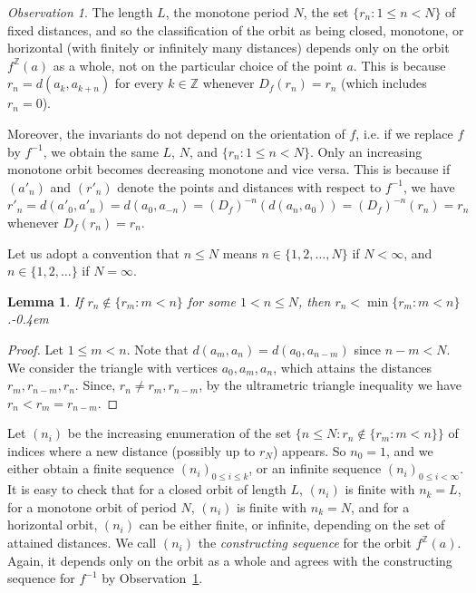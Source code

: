 \documentclass[10pt,a4paper]{article}
\newtheorem{lm}[tw]{Lemma}
\theoremstyle{definition}
\theoremstyle{remark}
\newtheorem{observation}[tw]{Observation}
\newcommand \set [1]{\{#1\}}
\newcommand \Z {\mathbb{Z}}
\begin{document}
\begin{observation} \label{obs:invariant}
    The length $L$, the monotone period $N$, the set $\set{r_n: 1 \leq n < N}$ of fixed distances, and so the classification of the orbit as being closed, monotone, or horizontal (with finitely or infinitely many distances) depends only on the orbit $f^\Z(a)$ as a whole, not on the particular choice of the point $a$.
    This is because $r_n = d(a_k, a_{k + n})$ for every $k \in \Z$ whenever $D_f(r_n) = r_n$ (which includes $r_n = 0$).

    Moreover, the invariants do not depend on the orientation of $f$, i.e. if we replace $f$ by $f^{-1}$, we obtain the same $L$, $N$, and $\set{r_n: 1 \leq n < N}$. Only an increasing monotone orbit becomes decreasing monotone and vice versa.
    This is because if $(a'_n)$ and $(r'_n)$ denote the points and distances with respect to $f^{-1}$, we have $r'_n = d(a'_0, a'_n) = d(a_0, a_{-n}) = (D_f)^{-n}(d(a_n, a_0)) = (D_f)^{-n}(r_n) = r_n$ whenever $D_f(r_n) = r_n$.
\end{observation}

Let us adopt a convention that $n \leq N$ means $n \in \set{1, 2, \ldots, N}$ if $N < \infty$, and $n \in \set{1, 2, \ldots}$ if $N = \infty$.

\begin{lm} \label{thm:decreasing_distances}
    If $r_n \notin \set{r_m: m < n}$ for some $1 < n \leq N$, then $r_n < \min\set{r_m: m < n}$.\kern-0.4em
\end{lm}
\begin{proof}
    Let $1 \leq m < n$.
    Note that $d(a_m, a_n) = d(a_0, a_{n - m})$ since $n - m < N$.
    We consider the triangle with vertices $a_0, a_m, a_n$, which attains the distances $r_m, r_{n - m}, r_n$.
    Since, $r_n \neq r_m, r_{n - m}$, by the ultrametric triangle inequality we have $r_n < r_m = r_{n - m}$.
\end{proof}

Let $(n_i)$ be the increasing enumeration of the set $\set{n \leq N: r_n \notin \set{r_m: m < n}}$ of indices where a new distance (possibly up to $r_N$) appears.
So $n_0 = 1$, and we either obtain a finite sequence $(n_i)_{0 \leq i \leq k}$, or an infinite sequence $(n_i)_{0 \leq i < \infty}$.
It is easy to check that 
for a closed orbit of length $L$, $(n_i)$ is finite with $n_k = L$,
for a monotone orbit of period $N$, $(n_i)$ is finite with $n_k = N$, and
for a horizontal orbit, $(n_i)$ can be either finite, or infinite, depending on the set of attained distances.
We call $(n_i)$ the \emph{constructing sequence} for the orbit $f^\Z(a)$.
Again, it depends only on the orbit as a whole and agrees with the constructing sequence for $f^{-1}$ by Observation~\ref{obs:invariant}.
\end{document}
